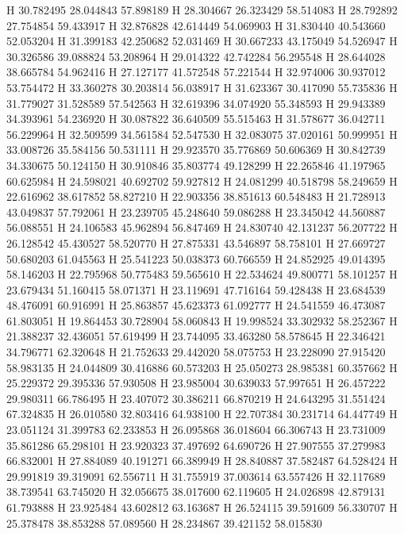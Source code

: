 \documentclass{article}
\begin{document}
H 30.782495 28.044843 57.898189 
H 28.304667 26.323429 58.514083 
H 28.792892 27.754854 59.433917 
H 32.876828 42.614449 54.069903 
H 31.830440 40.543660 52.053204 
H 31.399183 42.250682 52.031469 
H 30.667233 43.175049 54.526947 
H 30.326586 39.088824 53.208964 
H 29.014322 42.742284 56.295548 
H 28.644028 38.665784 54.962416 
H 27.127177 41.572548 57.221544 
H 32.974006 30.937012 53.754472 
H 33.360278 30.203814 56.038917 
H 31.623367 30.417090 55.735836 
H 31.779027 31.528589 57.542563 
H 32.619396 34.074920 55.348593 
H 29.943389 34.393961 54.236920 
H 30.087822 36.640509 55.515463 
H 31.578677 36.042711 56.229964 
H 32.509599 34.561584 52.547530 
H 32.083075 37.020161 50.999951 
H 33.008726 35.584156 50.531111 
H 29.923570 35.776869 50.606369 
H 30.842739 34.330675 50.124150 
H 30.910846 35.803774 49.128299 
H 22.265846 41.197965 60.625984 
H 24.598021 40.692702 59.927812 
H 24.081299 40.518798 58.249659 
H 22.616962 38.617852 58.827210 
H 22.903356 38.851613 60.548483 
H 21.728913 43.049837 57.792061 
H 23.239705 45.248640 59.086288 
H 23.345042 44.560887 56.088551 
H 24.106583 45.962894 56.847469 
H 24.830740 42.131237 56.207722 
H 26.128542 45.430527 58.520770 
H 27.875331 43.546897 58.758101 
H 27.669727 50.680203 61.045563 
H 25.541223 50.038373 60.766559 
H 24.852925 49.014395 58.146203 
H 22.795968 50.775483 59.565610 
H 22.534624 49.800771 58.101257 
H 23.679434 51.160415 58.071371 
H 23.119691 47.716164 59.428438 
H 23.684539 48.476091 60.916991 
H 25.863857 45.623373 61.092777 
H 24.541559 46.473087 61.803051 
H 19.864453 30.728904 58.060843 
H 19.998524 33.302932 58.252367 
H 21.388237 32.436051 57.619499 
H 23.744095 33.463280 58.578645 
H 22.346421 34.796771 62.320648 
H 21.752633 29.442020 58.075753 
H 23.228090 27.915420 58.983135 
H 24.044809 30.416886 60.573203 
H 25.050273 28.985381 60.357662 
H 25.229372 29.395336 57.930508 
H 23.985004 30.639033 57.997651 
H 26.457222 29.980311 66.786495 
H 23.407072 30.386211 66.870219 
H 24.643295 31.551424 67.324835 
H 26.010580 32.803416 64.938100 
H 22.707384 30.231714 64.447749 
H 23.051124 31.399783 62.233853 
H 26.095868 36.018604 66.306743 
H 23.731009 35.861286 65.298101 
H 23.920323 37.497692 64.690726 
H 27.907555 37.279983 66.832001 
H 27.884089 40.191271 66.389949 
H 28.840887 37.582487 64.528424 
H 29.991819 39.319091 62.556711 
H 31.755919 37.003614 63.557426 
H 32.117689 38.739541 63.745020 
H 32.056675 38.017600 62.119605 
H 24.026898 42.879131 61.793888 
H 23.925484 43.602812 63.163687 
H 26.524115 39.591609 56.330707 
H 25.378478 38.853288 57.089560 
H 28.234867 39.421152 58.015830 
\end{document}
